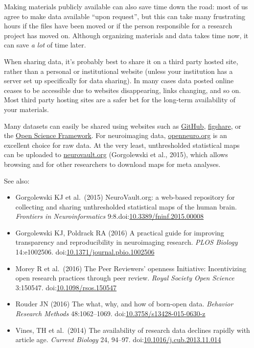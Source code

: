 \documentclass[letterpaper,oneside,11pt,article, portrait]{memoir}
\newcommand{\doi}[1]{doi:\href{http://dx.doi.org/#1}{#1}}
\newcommand{\journal}[1]{\textit{#1}} 			%
\begin{document}
Making materials publicly available can also save time down the road: most of us agree to make data available ``upon request'', but this can take many frustrating hours if the files have been moved or if the person responsible for a research project has moved on. Although organizing materials and data takes time now, it can save \textit{a lot} of time later.

When sharing data, it's probably best to share it on a third party hosted site, rather than a personal or institutional website (unless your institution has a server set up specifically for data sharing). In many cases data posted online ceases to be accessible due to websites disappearing, links changing, and so on. Most third party hosting sites are a safer bet for the long-term availability of your materials.

Many datasets can easily be shared using websites such as \href{https://github.com}{GitHub}, \href{https://figshare.com}{figshare}, or the \href{http://osf.io}{Open Science Framework}. For neuroimaging data, \url{openneuro.org} is an excellent choice for raw data. At the very least, unthresholded statistical maps can be uploaded to \url{neurovault.org} (Gorgolewski et al., 2015), which allows browsing and for other researchers to download maps for meta analyses.

\vspace{1em} \noindent See also:

\begin{itemize}
\item Gorgolewski KJ et al.\ (2015) NeuroVault.org: a web-based repository for collecting and sharing unthresholded statistical maps of the human brain. \journal{Frontiers in Neuroinformatics} 9:8.\newline \doi{10.3389/fninf.2015.00008}
\item Gorgolewski KJ, Poldrack RA (2016) A practical guide for improving transparency and reproducibility in neuroimaging research. \journal{PLOS Biology} 14:e1002506. \doi{10.1371/journal.pbio.1002506}
\item Morey R et al.\ (2016) The Peer Reviewers' openness Initiative: Incentivizing open research practices through peer review. \journal{Royal Society Open Science} 3:150547. \doi{10.1098/rsos.150547}
\item Rouder JN (2016) The what, why, and how of born-open data. \journal{Behavior Research Methods} 48:1062--1069. \doi{10.3758/s13428-015-0630-z}
\item Vines, TH et al.\ (2014) The availability of research data declines rapidly with article age. \journal{Current Biology} 24, 94--97. \doi{10.1016/j.cub.2013.11.014}
\end{itemize}
\end{document}
